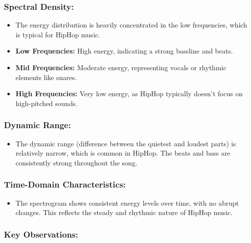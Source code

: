 \documentclass[a4paper,12pt]{article}
\begin{document}
\subsubsection{Spectral Density:}
\begin{itemize}
    \item The energy distribution is heavily concentrated in the low frequencies, which is typical for HipHop music.
    \item \textbf{Low Frequencies:} High energy, indicating a strong bassline and beats.
    \item \textbf{Mid Frequencies:} Moderate energy, representing vocals or rhythmic elements like snares.
    \item \textbf{High Frequencies:} Very low energy, as HipHop typically doesn’t focus on high-pitched sounds.
\end{itemize}
\subsubsection{Dynamic Range:}
\begin{itemize}
    \item The dynamic range (difference between the quietest and loudest parts) is relatively narrow, which is common in HipHop. The beats and bass are consistently strong throughout the song.
\end{itemize}
\subsubsection{Time-Domain Characteristics:}
\begin{itemize}
    \item The spectrogram shows consistent energy levels over time, with no abrupt changes. This reflects the steady and rhythmic nature of HipHop music.
\end{itemize}
\subsubsection{Key Observations:}
\end{document}

